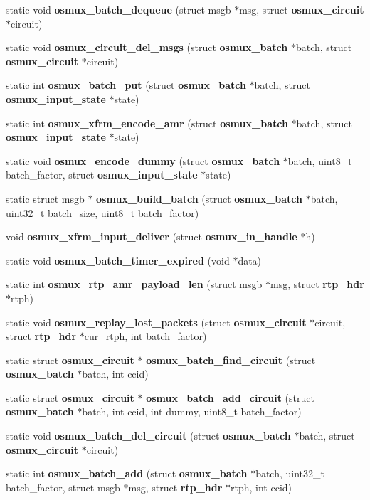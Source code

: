 \begin{DoxyCompactItemize}
static void {\bfseries osmux\+\_\+batch\+\_\+dequeue} (struct msgb $\ast$msg, struct {\bf osmux\+\_\+circuit} $\ast$circuit)
\item 
static void {\bfseries osmux\+\_\+circuit\+\_\+del\+\_\+msgs} (struct {\bf osmux\+\_\+batch} $\ast$batch, struct {\bf osmux\+\_\+circuit} $\ast$circuit)
\item 
static int {\bfseries osmux\+\_\+batch\+\_\+put} (struct {\bf osmux\+\_\+batch} $\ast$batch, struct {\bf osmux\+\_\+input\+\_\+state} $\ast$state)
\item 
static int {\bfseries osmux\+\_\+xfrm\+\_\+encode\+\_\+amr} (struct {\bf osmux\+\_\+batch} $\ast$batch, struct {\bf osmux\+\_\+input\+\_\+state} $\ast$state)
\item 
static void {\bfseries osmux\+\_\+encode\+\_\+dummy} (struct {\bf osmux\+\_\+batch} $\ast$batch, uint8\+\_\+t batch\+\_\+factor, struct {\bf osmux\+\_\+input\+\_\+state} $\ast$state)
\item 
static struct msgb $\ast$ {\bfseries osmux\+\_\+build\+\_\+batch} (struct {\bf osmux\+\_\+batch} $\ast$batch, uint32\+\_\+t batch\+\_\+size, uint8\+\_\+t batch\+\_\+factor)
\item 
void {\bfseries osmux\+\_\+xfrm\+\_\+input\+\_\+deliver} (struct {\bf osmux\+\_\+in\+\_\+handle} $\ast$h)
\item 
static void {\bfseries osmux\+\_\+batch\+\_\+timer\+\_\+expired} (void $\ast$data)
\item 
static int {\bfseries osmux\+\_\+rtp\+\_\+amr\+\_\+payload\+\_\+len} (struct msgb $\ast$msg, struct {\bf rtp\+\_\+hdr} $\ast$rtph)
\item 
static void {\bfseries osmux\+\_\+replay\+\_\+lost\+\_\+packets} (struct {\bf osmux\+\_\+circuit} $\ast$circuit, struct {\bf rtp\+\_\+hdr} $\ast$cur\+\_\+rtph, int batch\+\_\+factor)
\item 
static struct {\bf osmux\+\_\+circuit} $\ast$ {\bfseries osmux\+\_\+batch\+\_\+find\+\_\+circuit} (struct {\bf osmux\+\_\+batch} $\ast$batch, int ccid)
\item 
static struct {\bf osmux\+\_\+circuit} $\ast$ {\bfseries osmux\+\_\+batch\+\_\+add\+\_\+circuit} (struct {\bf osmux\+\_\+batch} $\ast$batch, int ccid, int dummy, uint8\+\_\+t batch\+\_\+factor)
\item 
static void {\bfseries osmux\+\_\+batch\+\_\+del\+\_\+circuit} (struct {\bf osmux\+\_\+batch} $\ast$batch, struct {\bf osmux\+\_\+circuit} $\ast$circuit)
\item 
static int {\bfseries osmux\+\_\+batch\+\_\+add} (struct {\bf osmux\+\_\+batch} $\ast$batch, uint32\+\_\+t batch\+\_\+factor, struct msgb $\ast$msg, struct {\bf rtp\+\_\+hdr} $\ast$rtph, int ccid)

\end{DoxyCompactItemize}
